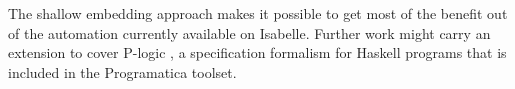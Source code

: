 \documentclass{llncs}
\begin{document}
The shallow embedding approach makes it possible to get most of the benefit
out of the automation currently available on Isabelle.  Further work might
carry an extension to cover P-logic \cite{KiebPl}, a specification formalism
for Haskell programs that is included in the Programatica toolset.




\end{document}
